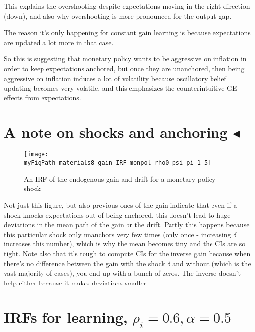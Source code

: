 \documentclass[11pt]{article}
\def \myFigPath {../figures/}
\renewcommand{\[}{\begin{equation}}
\renewcommand{\]}{\end{equation}}
\def\myMediumFigScale{0.25}
\begin{document}
This explains the overshooting despite expectations moving in the right direction (down), and also why overshooting is more pronounced for the output gap. 

The reason it's only happening for constant gain learning is because expectations are updated a lot more in that case.

So this is suggesting that monetary policy wants to be aggressive on inflation in order to keep expectations anchored, but once they are unanchored, then being aggressive on inflation induces a lot of volatility because oscillatory belief updating becomes very volatile, and this emphasizes the counterintuitive GE effects from expectations. 

\newpage
\section{A note on shocks and anchoring $\blacktriangleleft$} 
\begin{figure}[h!]
\texttt{[image: \\myFigPath materials8\_gain\_IRF\_monpol\_rho0\_psi\_pi\_1\_5]}
\caption{An IRF of the endogenous gain and drift for a monetary policy shock}
\end{figure}

Not just this figure, but also previous ones of the gain indicate that even if a shock knocks expectations out of being anchored, this doesn't lead to huge deviations in the mean path of the gain or the drift. Partly this happens because this particular shock only unanchors very few times (only once - increasing $\delta$ increases this number), which is why the mean becomes tiny and the CIs are so tight. Note also that it's tough to compute CIs for the inverse gain because when there's no difference between the gain with the shock $\delta$ and without (which is the vast majority of cases), you end up with a bunch of zeros. The inverse doesn't help either because it makes deviations smaller.

\newpage
\section{IRFs for learning, $\rho_i = 0.6, \alpha=0.5$}
\vspace{-0.3cm}
\end{document}
